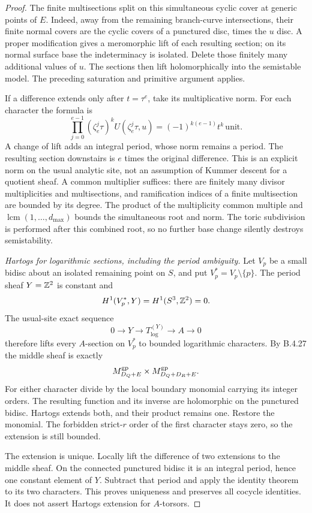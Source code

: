 \begin{proof}
The finite multisections split on this
simultaneous cyclic cover at generic points
of $E$.
Indeed, away from the remaining branch-curve
intersections, their finite normal covers
are the cyclic covers of a punctured disc,
times the $u$ disc. A proper modification
gives a meromorphic lift of each resulting
section; on its normal surface base the
indeterminacy is isolated. Delete those
finitely many additional values of $u$.
The sections then lift holomorphically into
the semistable model. The preceding
saturation and primitive argument applies.

If a difference extends only after
$t=\tau^e$, take its multiplicative norm.
For each character the formula is
\[
 \prod_{j=0}^{e-1}(\zeta_e^j\tau)^k
                      U(\zeta_e^j\tau,u)
   =(-1)^{k(e-1)}t^k\,\text{unit}.
 \tag{B.4.30.10}
\]
A change of lift adds an integral period,
whose norm remains a period. The resulting
section downstairs is $e$ times the original
difference. This is an explicit norm on the
usual analytic site, not an assumption of
Kummer descent for a quotient sheaf. A
common multiplier suffices: there are
finitely many divisor multiplicities and
multisections, and ramification indices of
a finite multisection are bounded by its
degree. The product of the multiplicity
common multiple and
$\operatorname{lcm}(1,\ldots,d_{\max})$
bounds the simultaneous root and norm.
The toric subdivision is performed after
this combined root, so no further base
change silently destroys semistability.

\emph{Hartogs for logarithmic sections, including the period ambiguity.}
Let $V_p$ be a small bidisc about an isolated
remaining point on $S$, and put
$V_p^*=V_p\setminus\{p\}$. The period sheaf
$Y=\mathbb Z^2$ is constant and
\[
 H^1(V_p^*,Y)=H^1(S^3,\mathbb Z^2)=0.
\]
The usual-site exact sequence
\[
 0\longrightarrow Y\longrightarrow
 T_{\log}^{(Y)}\longrightarrow A\longrightarrow0
 \tag{B.4.30.11}
\]
therefore lifts every $A$-section on $V_p^*$
to bounded logarithmic characters. By
B.4.27 the middle sheaf is exactly
\[
 M_{D_Q+E}^{\rm gp}\times
 M_{D_Q+D_R+E}^{\rm gp}.
\]
For either character divide by the local
boundary monomial carrying its integer
orders. The resulting function and its
inverse are holomorphic on the punctured
bidisc. Hartogs extends both, and their
product remains one. Restore the monomial.
The forbidden strict-$r$ order of the first
character stays zero, so the extension is
still bounded.

The extension is unique. Locally lift the
difference of two extensions to the middle
sheaf. On the connected punctured bidisc
it is an integral period, hence one constant
element of $Y$. Subtract that period and
apply the identity theorem to its two
characters. This proves uniqueness and
preserves all cocycle identities. It does
not assert Hartogs extension for $A$-torsors.


\end{proof}
